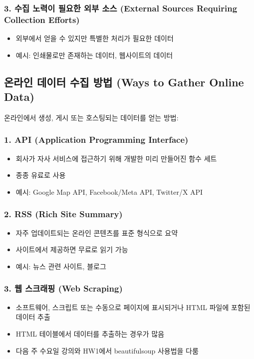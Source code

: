 \documentclass[12pt,a4paper]{article}
\begin{document}
\subsubsection{3. 수집 노력이 필요한 외부 소스 (External Sources Requiring Collection Efforts)}
\begin{itemize}
    \item 외부에서 얻을 수 있지만 특별한 처리가 필요한 데이터
    \item 예시: 인쇄물로만 존재하는 데이터, 웹사이트의 데이터
\end{itemize}

\subsection{온라인 데이터 수집 방법 (Ways to Gather Online Data)}

온라인에서 생성, 게시 또는 호스팅되는 데이터를 얻는 방법:

\subsubsection{1. API (Application Programming Interface)}
\begin{itemize}
    \item 회사가 자사 서비스에 접근하기 위해 개발한 미리 만들어진 함수 세트
    \item 종종 유료로 사용
    \item 예시: Google Map API, Facebook/Meta API, Twitter/X API
\end{itemize}

\subsubsection{2. RSS (Rich Site Summary)}
\begin{itemize}
    \item 자주 업데이트되는 온라인 콘텐츠를 표준 형식으로 요약
    \item 사이트에서 제공하면 무료로 읽기 가능
    \item 예시: 뉴스 관련 사이트, 블로그
\end{itemize}

\subsubsection{3. 웹 스크래핑 (Web Scraping)}
\begin{itemize}
    \item 소프트웨어, 스크립트 또는 수동으로 페이지에 표시되거나 HTML 파일에 포함된 데이터 추출
    \item HTML 테이블에서 데이터를 추출하는 경우가 많음
    \item 다음 주 수요일 강의와 HW1에서 beautifulsoup 사용법을 다룸
\end{itemize}
\end{document}
